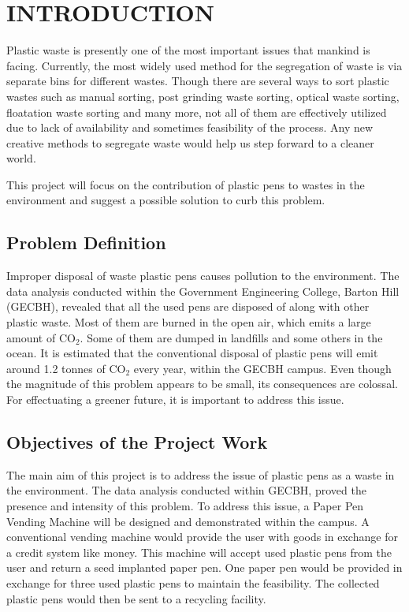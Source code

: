 \chapter{INTRODUCTION}\label{chap1}
\thispagestyle{empty}

Plastic waste is presently one of the most important issues that mankind is facing. Currently, the most widely used method for the segregation of waste is via separate bins for different wastes. Though there are several ways to sort plastic wastes such as manual sorting, post grinding waste sorting, optical waste sorting, floatation waste sorting and many more, not all of them are effectively utilized due to lack of availability and sometimes feasibility of the process. Any new creative methods to segregate waste would help us step forward to a cleaner world.

This project will focus on the contribution of plastic pens to wastes in the environment and suggest a possible solution to curb this problem.

\section{Problem Definition}

Improper disposal of waste plastic pens causes pollution to the environment. The data analysis conducted within the Government Engineering College, Barton Hill (GECBH), revealed that all the used pens are disposed of along with other plastic waste. Most of them are burned in the open air, which emits a large amount of CO$_2$. Some of them are dumped in landfills and some others in the ocean. It is estimated that the conventional disposal of plastic pens will emit around 1.2 tonnes of CO$_2$ every year, within the GECBH campus. Even though the magnitude of this problem appears to be small, its consequences are colossal. For effectuating a greener future, it is important to address this issue.

\section{Objectives of the Project Work}

The main aim of this project is to address the issue of plastic pens as a waste in the environment. The data analysis conducted within GECBH, proved the presence and intensity of this problem. To address this issue, a Paper Pen Vending Machine will be designed and demonstrated within the campus. A conventional vending machine would provide the user with goods in exchange for a credit system like money. This machine will accept used plastic pens from the user and return a seed implanted paper pen. One paper pen would be provided in exchange for three used plastic pens to maintain the feasibility.  The collected plastic pens would then be sent to a recycling facility.

